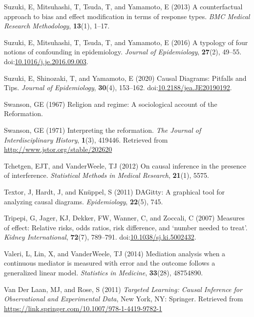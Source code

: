 \documentclass[
  singlecolumn]{article}
\newlength{\cslhangindent}
\newenvironment{CSLReferences}[2] %
 {\begin{list}{}{%
  \setlength{\itemindent}{0pt}
  \setlength{\leftmargin}{0pt}
  \setlength{\parsep}{0pt}
  \ifodd #1
   \setlength{\leftmargin}{\cslhangindent}
   \setlength{\itemindent}{-1\cslhangindent}
  \fi
  \setlength{\itemsep}{#2\baselineskip}}}
 {\end{list}}
\begin{document}
\begin{CSLReferences}{1}{0}
Suzuki, E, Mitsuhashi, T, Tsuda, T, and Yamamoto, E (2013) A
counterfactual approach to bias and effect modification in terms of
response types. \emph{BMC Medical Research Methodology}, \textbf{13}(1),
1--17.

Suzuki, E, Mitsuhashi, T, Tsuda, T, and Yamamoto, E (2016) A typology of
four notions of confounding in epidemiology. \emph{Journal of
Epidemiology}, \textbf{27}(2), 49--55.
doi:\href{https://doi.org/10.1016/j.je.2016.09.003}{10.1016/j.je.2016.09.003}.

Suzuki, E, Shinozaki, T, and Yamamoto, E (2020) Causal Diagrams:
Pitfalls and Tips. \emph{Journal of Epidemiology}, \textbf{30}(4),
153--162.
doi:\href{https://doi.org/10.2188/jea.JE20190192}{10.2188/jea.JE20190192}.

Swanson, GE (1967) Religion and regime: A sociological account of the
{R}eformation.

Swanson, GE (1971) Interpreting the reformation. \emph{The Journal of
Interdisciplinary History}, \textbf{1}(3), 419446. Retrieved from
\url{http://www.jstor.org/stable/202620}

Tchetgen, EJT, and VanderWeele, TJ (2012) On causal inference in the
presence of interference. \emph{Statistical Methods in Medical
Research}, \textbf{21}(1), 5575.

Textor, J, Hardt, J, and Knüppel, S (2011) DAGitty: A graphical tool for
analyzing causal diagrams. \emph{Epidemiology}, \textbf{22}(5), 745.

Tripepi, G, Jager, KJ, Dekker, FW, Wanner, C, and Zoccali, C (2007)
Measures of effect: Relative risks, odds ratios, risk difference, and
{`}number needed to treat{'}. \emph{Kidney International},
\textbf{72}(7), 789--791.
doi:\href{https://doi.org/10.1038/sj.ki.5002432}{10.1038/sj.ki.5002432}.

Valeri, L, Lin, X, and VanderWeele, TJ (2014) Mediation analysis when a
continuous mediator is measured with error and the outcome follows a
generalized linear model. \emph{Statistics in Medicine},
\textbf{33}(28), 48754890.

Van Der Laan, MJ, and Rose, S (2011) \emph{Targeted Learning: Causal
Inference for Observational and Experimental Data}, New York, NY:
Springer. Retrieved from
\url{https://link.springer.com/10.1007/978-1-4419-9782-1}


\end{CSLReferences}
\end{document}

